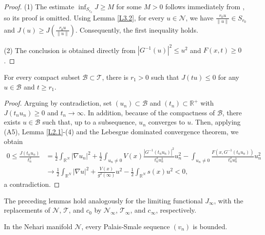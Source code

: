 \documentclass[reqno]{amsart}
\begin{document}
\begin{proof}
(1) The estimate $\inf_{S_{r_0}}J\geq M$ for some $M>0$ follows immediately from 
\cite[Lemma 2.1]{shen},  so its proof is omitted. Using Lemma \ref{L3.2}, for every 
$u\in\mathcal{N}$, we have $\frac{r_0u}{\|u\|}\in S_{r_0}$ and 
$J(u)\geq J(\frac{r_0u}{\|u\|})$. Consequently, the first inequality holds.

(2)  The conclusion is obtained directly from $|G^{-1}(u)|^2\leq u^2$ and $F(x,t)\geq0$.
\end{proof}


\begin{lemma}\label{L3.4} 
For every compact subset  $\mathcal{B}\subset \mathcal{T}$, there is $r_1>0$ such that 
$J(tu)\leq 0$ for any $u\in\mathcal{B}$ and $t\geq r_1$.
\end{lemma}

\begin{proof}
Arguing by contradiction, set $(u_n)\subset \mathcal{B}$ and $(t_n)\subset \mathbb{R}^+$ with 
$J(t_nu_n)\geq 0$ and  $t_n\to\infty$. In addition, because of the compactness of 
$\mathcal{B}$, there exists $u \in \mathcal{B}$ such that, up to a subsequence, 
$u_n$ converges to $u$. Then, applying (A5), Lemma \ref{L2.1}-(4)  and the Lebesgue 
dominated convergence theorem, we obtain
\begin{align*}
0\leq\frac{J(t_nu_n)}{t^2_n}
&=\frac{1}{2}\int_{\mathbb{R}^N}|\nabla u_n|^2
+\frac{1}{2}\int_{u_n\neq 0}V(x)\frac{|G^{-1}(t_nu_n)|^2}{t^2_nu^2_n}u^2_n
 -\int_{u_n\neq 0}\frac{F(x,G^{-1}(t_nu_n))}{t^2_nu^2_n}u^2_n \\
&\to \frac{1}{2}\int_{\mathbb{R}^N}|\nabla u|^2+\frac{V(x)}{g^2(\infty)}u^2-\frac{1}{2}\int_{\mathbb{R}^N}s(x)u^2<0,
\end{align*}
a contradiction.
\end{proof}

The preceding lemmas hold analogously for the limiting functional $J_\infty$, 
with the replacements of $\mathcal{N}$, $\mathcal{T}$, and $c_0$ by $\mathcal{N_\infty}$, 
$\mathcal{T_\infty}$, and $c_\infty$, respectively.

\begin{lemma}\label{L3.5} 
In the Nehari manifold $\mathcal{N}$, every Palais‑Smale sequence $(v_n)$  is bounded.
\end{lemma}
\end{document}
